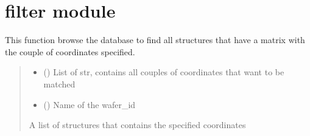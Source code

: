 \documentclass[letterpaper,10pt,english]{sphinxmanual}
\begin{document}
\sphinxstepscope


\chapter{filter module}
\label{\detokenize{filter:module-filter}}\label{\detokenize{filter:filter-module}}\label{\detokenize{filter::doc}}

\begin{fulllineitems}
\label{\detokenize{filter:filter.filter_by_coord}}
\pysigstartsignatures
{}
\pysigstopsignatures
\sphinxAtStartPar
This function browse the database to find all structures that have a matrix with the couple of coordinates specified.
\begin{quote}\begin{description}
\begin{itemize}
\item {} 
\sphinxAtStartPar
{} () \textendash{} List of str, contains all couples of coordinates that want to be matched

\item {} 
\sphinxAtStartPar
{} () \textendash{} Name of the wafer\_id

\end{itemize}

\sphinxAtStartPar
A list of structures that contains the specified coordinates

\end{description}\end{quote}

\end{fulllineitems}

\end{document}
